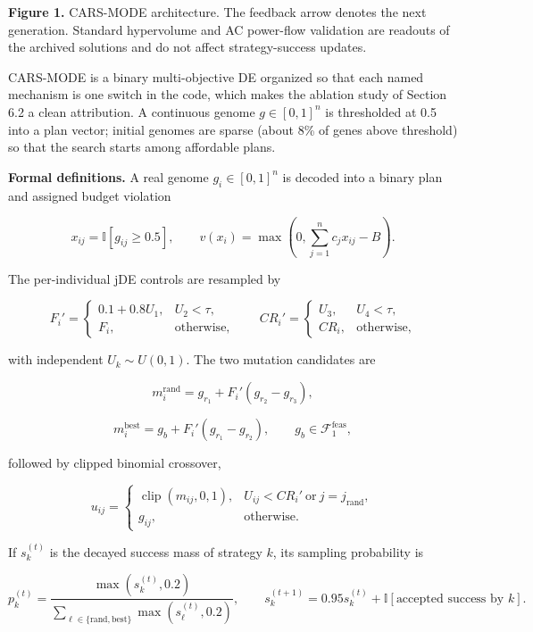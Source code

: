 \documentclass[
  10pt,
  a4paper,
]{article}
\begin{document}
\textbf{Figure 1.} CARS-MODE architecture. The feedback arrow denotes
the next generation. Standard hypervolume and AC power-flow validation
are readouts of the archived solutions and do not affect
strategy-success updates.

CARS-MODE is a binary multi-objective DE organized so that each named
mechanism is one switch in the code, which makes the ablation study of
Section 6.2 a clean attribution. A continuous genome \(g \in [0,1]^n\)
is thresholded at 0.5 into a plan vector; initial genomes are sparse
(about 8\% of genes above threshold) so that the search starts among
affordable plans.

\textbf{Formal definitions.} A real genome \(g_i\in[0,1]^n\) is decoded
into a binary plan and assigned budget violation

\[
x_{ij}=\mathbb I[g_{ij}\geq0.5],\qquad
v(x_i)=\max\!\left(0,\sum_{j=1}^{n}c_jx_{ij}-B\right).
\]

The per-individual jDE controls are resampled by

\[
F_i'=\begin{cases}0.1+0.8U_1,&U_2<\tau,\\F_i,&\text{otherwise},\end{cases}
\qquad
CR_i'=\begin{cases}U_3,&U_4<\tau,\\CR_i,&\text{otherwise},\end{cases}
\]

with independent \(U_k\sim U(0,1)\). The two mutation candidates are

\[
m_i^{\mathrm{rand}}=g_{r_1}+F_i'(g_{r_2}-g_{r_3}),
\]

\[
m_i^{\mathrm{best}}=g_b+F_i'(g_{r_1}-g_{r_2}),\qquad g_b\in\mathcal F_1^{\mathrm{feas}},
\]

followed by clipped binomial crossover,

\[
u_{ij}=\begin{cases}\operatorname{clip}(m_{ij},0,1),&
U_{ij}<CR_i'\ \text{or}\ j=j_{\mathrm{rand}},\\
g_{ij},&\text{otherwise}.
\end{cases}
\]

If \(s_k^{(t)}\) is the decayed success mass of strategy \(k\), its
sampling probability is

\[
p_k^{(t)}=\frac{\max(s_k^{(t)},0.2)}
{\sum_{\ell\in\{\mathrm{rand},\mathrm{best}\}}\max(s_\ell^{(t)},0.2)},
\qquad
s_k^{(t+1)}=0.95s_k^{(t)}+\mathbb I[\text{accepted success by }k].
\]
\end{document}
